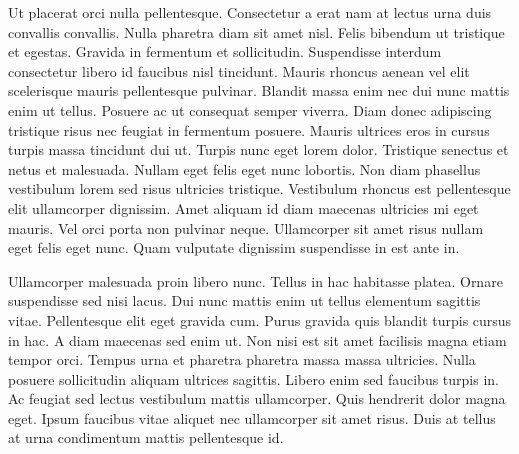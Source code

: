 \documentclass[11pt]{article}
\begin{document}
Ut placerat orci nulla pellentesque. Consectetur a erat nam at lectus urna duis convallis convallis. Nulla pharetra diam sit amet nisl. Felis bibendum ut tristique et egestas. Gravida in fermentum et sollicitudin. Suspendisse interdum consectetur libero id faucibus nisl tincidunt. Mauris rhoncus aenean vel elit scelerisque mauris pellentesque pulvinar. Blandit massa enim nec dui nunc mattis enim ut tellus. Posuere ac ut consequat semper viverra. Diam donec adipiscing tristique risus nec feugiat in fermentum posuere. Mauris ultrices eros in cursus turpis massa tincidunt dui ut. Turpis nunc eget lorem dolor. Tristique senectus et netus et malesuada. Nullam eget felis eget nunc lobortis. Non diam phasellus vestibulum lorem sed risus ultricies tristique. Vestibulum rhoncus est pellentesque elit ullamcorper dignissim. Amet aliquam id diam maecenas ultricies mi eget mauris. Vel orci porta non pulvinar neque. Ullamcorper sit amet risus nullam eget felis eget nunc. Quam vulputate dignissim suspendisse in est ante in.

Ullamcorper malesuada proin libero nunc. Tellus in hac habitasse platea. Ornare suspendisse sed nisi lacus. Dui nunc mattis enim ut tellus elementum sagittis vitae. Pellentesque elit eget gravida cum. Purus gravida quis blandit turpis cursus in hac. A diam maecenas sed enim ut. Non nisi est sit amet facilisis magna etiam tempor orci. Tempus urna et pharetra pharetra massa massa ultricies. Nulla posuere sollicitudin aliquam ultrices sagittis. Libero enim sed faucibus turpis in. Ac feugiat sed lectus vestibulum mattis ullamcorper. Quis hendrerit dolor magna eget. Ipsum faucibus vitae aliquet nec ullamcorper sit amet risus. Duis at tellus at urna condimentum mattis pellentesque id.
\end{document}
